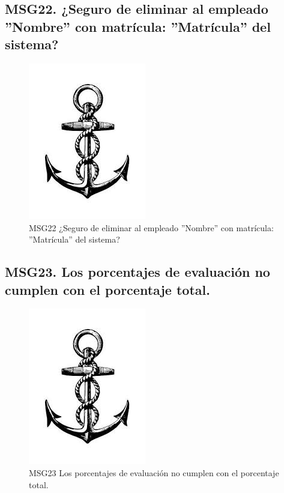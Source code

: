 \subsection{MSG22. ¿Seguro de eliminar al empleado ''Nombre'' con matrícula: ''Matrícula'' del sistema?}
    \begin{figure}[htbp]
        \begin{center}
            \includegraphics[width=.4\textwidth]{images/MSG/ancla}
            \caption{MSG22 ¿Seguro de eliminar al empleado ''Nombre'' con matrícula: ''Matrícula'' del sistema?}
            \label{fig:MSG22}
        \end{center}
    \end{figure}

\subsection{MSG23. Los porcentajes de evaluación no cumplen con el porcentaje total.}
    \begin{figure}[htbp]
        \begin{center}
            \includegraphics[width=.4\textwidth]{images/MSG/ancla}
            \caption{ MSG23 Los porcentajes de evaluación no cumplen con el porcentaje total.}
            \label{fig:MSG21}
        \end{center}
    \end{figure}

